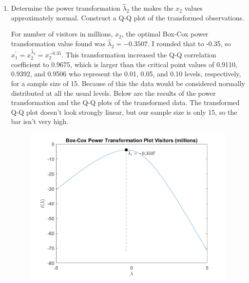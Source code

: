 \begin{enumerate}[label= (\alph*)]
    \item Determine the power transformation $\hat{\lambda}_{2}$ the makes the $x_{2}$ values approximately
    normal. Construct a Q-Q plot of the transformed observations.


    For number of visitors in millions, $x_{2}$, the optimal Box-Cox power transformation value found was $\hat{\lambda}_{2} = -0.3507$.
    I rounded that to -0.35, so $x_{1}^{\prime} = x_{2}^{\hat{\lambda}_{2}} = x_{2}^{-0.35}$. This transformation increased the Q-Q correlation coefficient to 0.9675, which is larger than the critical point values of 0.9110, 0.9392, and 0.9506 who represent the 0.01, 0.05, and 0.10 levels, respectively, for a sample size of 15.
    Because of this the data would be considered normally distributed at all the usual levels.
    Below are the results of the power transformation and the Q-Q plots of the transformed data.
    The transformed Q-Q plot doesn't look strongly linear, but our sample size is only 15, so the bar isn't very high.

    \begin{center}
        \begin{figure}[H]
            \centering
            \includegraphics[scale=0.4]{./matlab/chapter-4/sol4.40.power.2.png}
        \end{figure}
    \end{center}
    

\end{enumerate}
